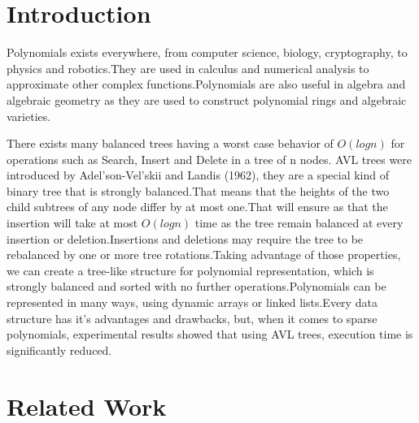 \documentclass[journal,article,submit,moreauthors,algorithms]{Definitions/mdpi}
\begin{document}
\section{Introduction}
Polynomials exists everywhere, from computer science, biology, cryptography, to physics and robotics.They are used in calculus and numerical analysis to approximate other complex functions.Polynomials are also useful in algebra and algebraic geometry as they are used to construct polynomial rings and algebraic varieties.

There exists many balanced trees having a worst case behavior of $O(logn)$ for operations such as Search, Insert and Delete in a tree of n nodes. AVL trees were introduced by Adel'son-Vel'skii and Landis (1962), they are a special kind of binary tree that is strongly balanced.That means that the heights of the two child subtrees of any node differ by at most one.That will ensure as that the insertion will take at most $O(logn)$ time \cite{siddharth,karlton,tsakalidis} as the tree remain balanced at every insertion or deletion.Insertions and deletions may require the
tree to be rebalanced by one or more tree rotations.Taking advantage of those properties, we can create a tree-like structure for polynomial representation, which is strongly balanced and sorted with no further operations.Polynomials can be represented in many ways, using dynamic arrays or linked lists.Every data structure has it's advantages and drawbacks, but, when it comes to sparse polynomials, experimental results showed that using AVL trees, execution time is significantly reduced.
\section{Related Work}
\end{document}
